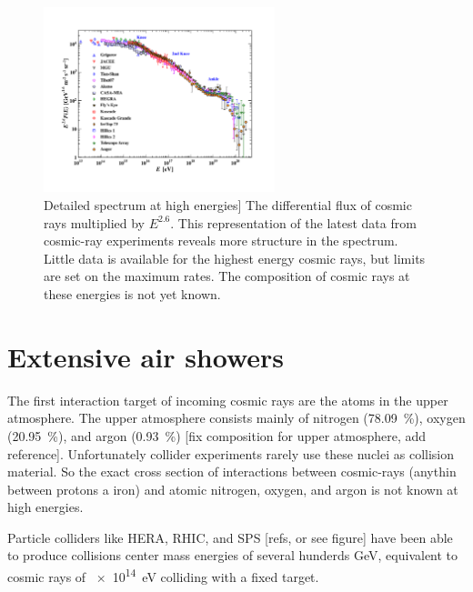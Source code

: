 \begin{figure}
    \centering
    \includegraphics[width=0.6\textwidth]
                    {plots/cosmic-rays/PDG_28_8_all_particle_spectrum}
    \caption{Detailed spectrum at high energies]
The differential flux of cosmic rays multiplied by $E^{2.6}$. This representation of the latest data from cosmic-ray experiments reveals more structure in the spectrum. Little data is available for the highest energy cosmic rays, but limits are set on the maximum rates. The composition of cosmic rays at these energies is not yet known.}
    \label{fig:PDG_28_8_all_particle_spectrum}
\end{figure}


\section{Extensive air showers}
\label{sec:cr:eas}

The first interaction target of incoming cosmic rays are the atoms in the upper atmosphere. The upper atmosphere consists mainly of nitrogen (\SI{78.09}{\percent}), oxygen (\SI{20.95}{\percent}), and argon (\SI{0.93}{\percent}) [fix composition for upper atmosphere, add reference]. Unfortunately collider experiments rarely use these nuclei as collision material. So the exact cross section of interactions between cosmic-rays (anythin between protons a iron) and atomic nitrogen, oxygen, and argon is not known at high energies.

Particle colliders like HERA, RHIC, and SPS [refs, or see figure] have been able to produce collisions center mass energies of several hunderds \si{\GeV}, equivalent to cosmic rays of \SI{e14}{\eV} colliding with a fixed target.

